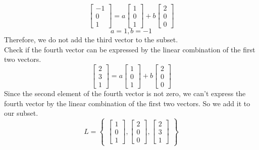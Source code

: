 \documentclass[oneside]{book}
\begin{document}
{\[\begin{bmatrix}
            -1\\0\\1
        \end{bmatrix}
        = a\begin{bmatrix}
            1\\0\\1
        \end{bmatrix}
        + b\begin{bmatrix}
            2\\0\\0
        \end{bmatrix}
    \]
    \[
        a = 1, b = -1
    \]
    Therefore, we do not add the third vector to the subset.\\
    Check if the fourth vector can be expressed by the linear combination of the first two vectors.\\
    \[
        \begin{bmatrix}
            2\\3\\1
        \end{bmatrix}
        = a\begin{bmatrix}
            1\\0\\1
        \end{bmatrix}
        + b\begin{bmatrix}
            2\\0\\0
        \end{bmatrix}
    \]
    Since the second element of the fourth vector is not zero, we can't express the fourth vector by the linear combination of the first two vectors. So we add it to our subset.\\
    \[
        \boxed{L = \begin{Bmatrix}
            \begin{bmatrix}
                1\\0\\1
            \end{bmatrix},
            \begin{bmatrix}
                2\\0\\0
            \end{bmatrix},
            \begin{bmatrix}
                2\\3\\1
            \end{bmatrix}
        \end{Bmatrix}}
    \]

}
\end{document}

